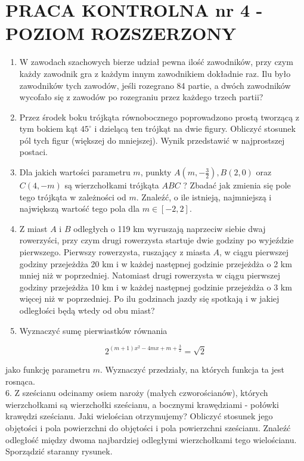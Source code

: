 \documentclass[10pt]{article}
\begin{document}
\section*{PRACA KONTROLNA nr 4 - POZIOM ROZSZERZONY}
\begin{enumerate}
  \item W zawodach szachowych bierze udział pewna ilość zawodników, przy czym każdy zawodnik gra z każdym innym zawodnikiem dokładnie raz. Ilu było zawodników tych zawodów, jeśli rozegrano 84 partie, a dwóch zawodników wycofało się z zawodów po rozegraniu przez każdego trzech partii?
  \item Przez środek boku trójkąta równobocznego poprowadzono prostą tworzącą z tym bokiem kąt $45^{\circ}$ i dzielącą ten trójkąt na dwie figury. Obliczyć stosunek pól tych figur (większej do mniejszej). Wynik przedstawić w najprostszej postaci.
  \item Dla jakich wartości parametru $m$, punkty $A\left(m,-\frac{3}{2}\right), B(2,0)$ oraz $C(4,-m)$ są wierzchołkami trójkąta $A B C$ ? Zbadać jak zmienia się pole tego trójkąta w zależności od $m$. Znaleźć, o ile istnieją, najmniejszą i największą wartość tego pola dla $m \in[-2,2]$.
  \item Z miast $A$ i $B$ odległych o 119 km wyruszają naprzeciw siebie dwaj rowerzyści, przy czym drugi rowerzysta startuje dwie godziny po wyjeździe pierwszego. Pierwszy rowerzysta, ruszający z miasta $A$, w ciągu pierwszej godziny przejeżdża 20 km i w każdej następnej godzinie przejeżdża o 2 km mniej niż w poprzedniej. Natomiast drugi rowerzysta w ciągu pierwszej godziny przejeżdża 10 km i w każdej następnej godzinie przejeżdża o 3 km więcej niż w poprzedniej. Po ilu godzinach jazdy się spotkają i w jakiej odległości będą wtedy od obu miast?
  \item Wyznaczyć sumę pierwiastków równania
\end{enumerate}

$$
2^{(m+1) x^{2}-4 m x+m+\frac{3}{2}}=\sqrt{2}
$$

jako funkcję parametru $m$. Wyznaczyć przedziały, na których funkcja ta jest rosnąca.\\
6. Z sześcianu odcinamy osiem naroży (małych czworościanów), których wierzchołkami są wierzchołki sześcianu, a bocznymi krawędziami - połówki krawędzi sześcianu. Jaki wielościan otrzymujemy? Obliczyć stosunek jego objętości i pola powierzchni do objętości i pola powierzchni sześcianu. Znaleźć odległość między dwoma najbardziej odległymi wierzchołkami tego wielościanu. Sporządzić staranny rysunek.
\end{document}
